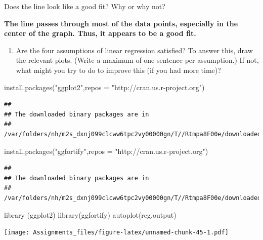 \documentclass[
]{article}
\newenvironment{Shaded}{\begin{snugshade}}{\end{snugshade}}
\newcommand{\AttributeTok}[1]{\textcolor[rgb]{0.77,0.63,0.00}{#1}}
\newcommand{\FunctionTok}[1]{\textcolor[rgb]{0.00,0.00,0.00}{#1}}
\newcommand{\NormalTok}[1]{#1}
\newcommand{\StringTok}[1]{\textcolor[rgb]{0.31,0.60,0.02}{#1}}
\providecommand{\tightlist}{%
  \setlength{\itemsep}{0pt}\setlength{\parskip}{0pt}}
\begin{document}
Does the line look like a good fit? Why or why not?

\textbf{The line passes through most of the data points, especially in
the center of the graph. Thus, it appears to be a good fit.}

\begin{enumerate}
\def\labelenumi{\alph{enumi}.}
\setcounter{enumi}{3}
\tightlist
\item
  Are the four assumptions of linear regression satisfied? To answer
  this, draw the relevant plots. (Write a maximum of one sentence per
  assumption.) If not, what might you try to do to improve this (if you
  had more time)?
\end{enumerate}

\begin{Shaded}
\begin{Highlighting}[]
\FunctionTok{install.packages}\NormalTok{(}\StringTok{"ggplot2"}\NormalTok{,}\AttributeTok{repos =} \StringTok{"http://cran.us.r{-}project.org"}\NormalTok{)}
\end{Highlighting}
\end{Shaded}

\begin{verbatim}
## 
## The downloaded binary packages are in
##  /var/folders/nh/m2s_dxnj099clcww6tpc2vy00000gn/T//Rtmpa8F00e/downloaded_packages
\end{verbatim}

\begin{Shaded}
\begin{Highlighting}[]
\FunctionTok{install.packages}\NormalTok{(}\StringTok{"ggfortify"}\NormalTok{,}\AttributeTok{repos =} \StringTok{"http://cran.us.r{-}project.org"}\NormalTok{)}
\end{Highlighting}
\end{Shaded}

\begin{verbatim}
## 
## The downloaded binary packages are in
##  /var/folders/nh/m2s_dxnj099clcww6tpc2vy00000gn/T//Rtmpa8F00e/downloaded_packages
\end{verbatim}

\begin{Shaded}
\begin{Highlighting}[]
\FunctionTok{library}\NormalTok{ (ggplot2)}
\FunctionTok{library}\NormalTok{(ggfortify)}
\FunctionTok{autoplot}\NormalTok{(reg.output)}
\end{Highlighting}
\end{Shaded}

\texttt{[image: Assignments\_files/figure-latex/unnamed-chunk-45-1.pdf]}
\end{document}
